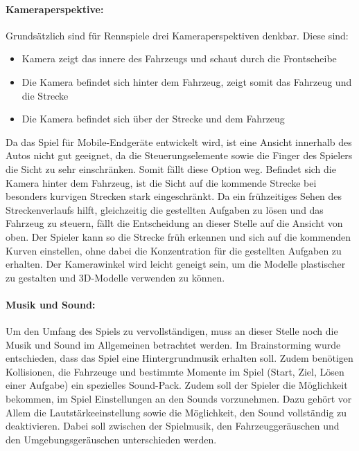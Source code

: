 		\paragraph{Kameraperspektive:}
		Grundsätzlich sind für Rennspiele drei Kameraperspektiven denkbar. Diese sind:
		\begin{itemize}
			\item{Kamera zeigt das innere des Fahrzeugs und schaut durch die Frontscheibe}
			\item{Die Kamera befindet sich hinter dem Fahrzeug, zeigt somit das Fahrzeug und die Strecke}
			\item{Die Kamera befindet sich über der Strecke und dem Fahrzeug}
		\end{itemize}
		Da das Spiel für Mobile-Endgeräte entwickelt wird, ist eine Ansicht innerhalb des Autos nicht gut geeignet, da die Steuerungselemente sowie die Finger des Spielers die Sicht zu sehr einschränken. Somit fällt diese Option weg.
		Befindet sich die Kamera hinter dem Fahrzeug, ist die Sicht auf die kommende Strecke bei besonders kurvigen Strecken stark eingeschränkt. Da ein frühzeitiges Sehen des Streckenverlaufs hilft, gleichzeitig die gestellten Aufgaben zu lösen und das Fahrzeug zu steuern, fällt die Entscheidung an dieser Stelle auf die Ansicht von oben.
		Der Spieler kann so die Strecke früh erkennen und sich auf die kommenden Kurven einstellen, ohne dabei die Konzentration für die gestellten Aufgaben zu erhalten. Der Kamerawinkel wird leicht geneigt sein, um die Modelle plastischer zu gestalten und 3D-Modelle verwenden zu können.

		\paragraph{Musik und Sound:}
		Um den Umfang des Spiels zu vervollständigen, muss an dieser Stelle noch die Musik und Sound im Allgemeinen betrachtet werden. Im Brainstorming wurde entschieden, dass das Spiel eine Hintergrundmusik erhalten soll. Zudem benötigen Kollisionen, die Fahrzeuge und bestimmte Momente im Spiel (Start, Ziel, Lösen einer Aufgabe) ein spezielles Sound-Pack.
		Zudem soll der Spieler die Möglichkeit bekommen, im Spiel Einstellungen an den Sounds vorzunehmen. Dazu gehört vor Allem die Lautstärkeeinstellung sowie die Möglichkeit, den Sound vollständig zu deaktivieren. Dabei soll zwischen der Spielmusik, den Fahrzeuggeräuschen und den Umgebungsgeräuschen unterschieden werden.

